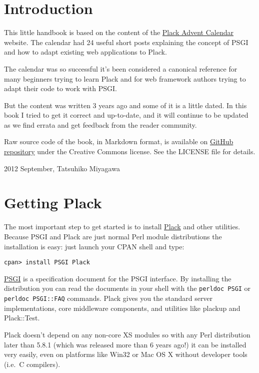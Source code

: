 \chapter*{Introduction}\label{introduction}

This little handbook is based on the content of the
\href{http://advent.plackperl.org/}{Plack Advent Calendar} website. The
calendar had 24 useful short posts explaining the concept of PSGI and
how to adapt existing web applications to Plack.

The calendar was so successful it's been considered a canonical
reference for many beginners trying to learn Plack and for web framework
authors trying to adapt their code to work with PSGI.

But the content was written 3 years ago and some of it is a little
dated. In this book I tried to get it correct and up-to-date, and it
will continue to be updated as we find errata and get feedback from the
reader community.

Raw source code of the book, in Markdown format, is available on
\href{https://github.com/miyagawa/plack-handbook}{GitHub repository}
under the Creative Commons license. See the LICENSE file for details.

2012 September, Tatsuhiko Miyagawa

\chapter{Getting Plack}\label{day-1-getting-plack}

The most important step to get started is to install
\href{http://search.cpan.org/dist/Plack}{Plack} and other utilities.
Because PSGI and Plack are just normal Perl module distributions the
installation is easy: just launch your CPAN shell and type:

\begin{lstlisting}
cpan> install PSGI Plack
\end{lstlisting}

\href{http://search.cpan.org/dist/PSGI}{PSGI} is a specification
document for the PSGI interface. By installing the distribution you can
read the documents in your shell with the \lstinline!perldoc PSGI! or
\lstinline!perldoc PSGI::FAQ! commands. Plack gives you the standard
server implementations, core middleware components, and utilities like
plackup and Plack::Test.

Plack doesn't depend on any non-core XS modules so with any Perl
distribution later than 5.8.1 (which was released more than 6 years
ago!) it can be installed very easily, even on platforms like Win32 or
Mac OS X without developer tools (i.e.~C compilers).

